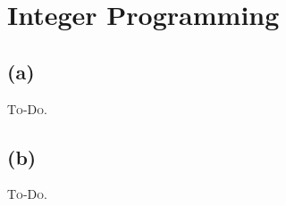 

\setcounter{section}{3}


\section{Integer Programming}

\subsection{(a)}

\textsc{To-Do.}

\subsection{(b)}

\textsc{To-Do.}


